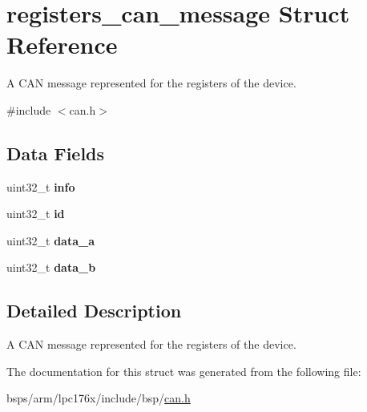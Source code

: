 \hypertarget{structregisters__can__message}{}\section{registers\+\_\+can\+\_\+message Struct Reference}
\label{structregisters__can__message}


A C\+AN message represented for the registers of the device.  




{\ttfamily \#include $<$can.\+h$>$}

\subsection*{Data Fields}
\begin{DoxyCompactItemize}
\item 
\mbox{\label{structregisters__can__message_a0ef5891745c067ed00d18381977351e6}} 
uint32\+\_\+t {\bfseries info}
\item 
\mbox{\label{structregisters__can__message_ad87743714008c1e13eda5a244904df76}} 
uint32\+\_\+t {\bfseries id}
\item 
\mbox{\label{structregisters__can__message_a299f01e6ab0b93df5ae3a8826475a4b1}} 
uint32\+\_\+t {\bfseries data\+\_\+a}
\item 
\mbox{\label{structregisters__can__message_abb011a81822a39b9c44b2ebc5daab512}} 
uint32\+\_\+t {\bfseries data\+\_\+b}
\end{DoxyCompactItemize}


\subsection{Detailed Description}
A C\+AN message represented for the registers of the device. 

The documentation for this struct was generated from the following file\+:\begin{DoxyCompactItemize}
\item 
bsps/arm/lpc176x/include/bsp/\mbox{\hyperlink{can_8h}{can.\+h}}\end{DoxyCompactItemize}
